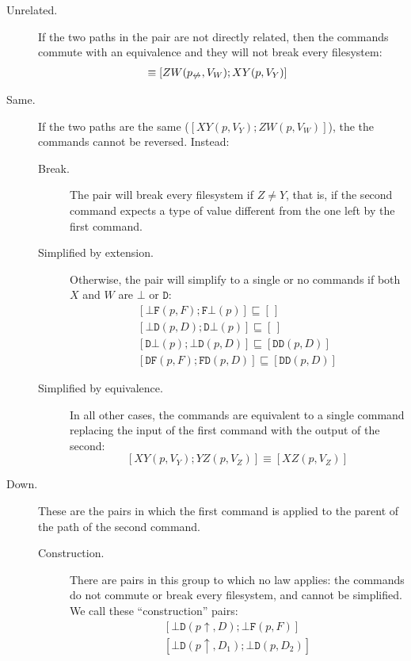 \documentclass[12pt]{article}
\newcommand{\empt}{\bot}
\newcommand{\pp}{p\!\!\uparrow} %
\newcommand{\fscommand}[2]{{#1#2}}
\newcommand{\fsregcommandchar}[1]{\mathtt{#1}}
\newcommand{\fsregcommand}[2]{\fscommand{\fsregcommandchar{#1}}{\fsregcommandchar{#2}}}
\newcommand{\cbf}{\fsregcommand{\empt}{F}}
\newcommand{\cbd}{\fsregcommand{\empt}{D}}
\newcommand{\cfb}{\fsregcommand{F}{\empt}}
\newcommand{\cfd}{\fsregcommand{F}{D}}
\newcommand{\cdb}{\fsregcommand{D}{\empt}}
\newcommand{\cdf}{\fsregcommand{D}{F}}
\newcommand{\cdd}{\fsregcommand{D}{D}}
\newcommand{\cxy}{\fscommand{X}{Y}}
\newcommand{\cyz}{\fscommand{Y}{Z}}
\newcommand{\cxz}{\fscommand{X}{Z}}
\newcommand{\czw}{\fscommand{Z}{W}}
\newcommand{\eqext}{\sqsubseteq}
\newcommand{\np}{p_{\centernot\leftrightarrow}} %
\newcommand{\emptyseq}{[\,]}
\theoremstyle{definition}
\begin{document}
\begin{description}
\item[Unrelated.] If the two paths in the pair are not directly related, then
the commands commute with an equivalence and they will not break every filesystem:
\begin{align*}
[\cxy(p,V_Y); \czw(\np,V_W)] &\equiv [\czw(\np,V_W); \cxy(p,V_Y)]
\end{align*}
%
\item[Same.] If the two paths are the same ($[\cxy(p,V_Y); \czw(p,V_W)]$), the
the commands cannot be reversed. Instead:
   \begin{description}
   \item[Break.]
   The pair will break every filesystem if $Z\ne Y$, that is, if the second
   command expects a type of value different from the one left by the first command.
   \item[Simplified by extension.]
   Otherwise, the pair will simplify to a single or no commands
   if both $X$ and $W$ are $\fsregcommandchar{\empt}$ or $\fsregcommandchar{D}$:
   \begin{gather*}
            [\cbf(p, F); \cfb(p)] \eqext \emptyseq \\
            [\cbd(p, D); \cdb(p)] \eqext \emptyseq \\
            [\cdb(p); \cbd(p, D)] \eqext [\cdd(p, D)] \\
            [\cdf(p, F); \cfd(p, D)] \eqext [\cdd(p, D)]
   \end{gather*}
   \item[Simplified by equivalence.]
   In all other cases, the commands are equivalent to a single command
   replacing the input of the first command with the output of the second:
   \[ [\cxy(p, V_Y); \cyz(p, V_Z)] \equiv [\cxz(p, V_Z)] \]
   \end{description}
%
\item[Down.]
These are the pairs in which the first command is applied to the parent of the path
of the second command.
   \begin{description}
   \item[Construction.] There are pairs in this group to which no law applies:
   the commands do not commute or break every filesystem, and cannot be simplified.
   We call these ``construction'' pairs:
   \begin{gather*}
            [\cbd(\pp, D); \cbf(p, F)] \\
            [\cbd(\pp, D_1); \cbd(p, D_2)] \\

\end{gather*}
\end{description}
\end{description}
\end{document}
